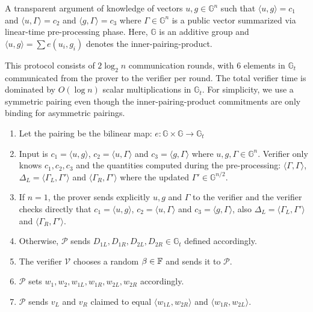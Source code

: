 \documentclass{article}
\begin{document}
\begin{boxx1} \label{def:final-dory}
A transparent argument of knowledge of vectors $u, g \in \mathbb{G}^n$ such that $\langle u, g\rangle = c_1$ and $\langle u, \Gamma \rangle = c_2$ and $\langle g, \Gamma\rangle = c_3$ where $\Gamma \in \mathbb{G}^n$ is a public vector summarized via linear-time pre-processing phase. Here, $\mathbb{G}$ is an additive group and $\langle u, g \rangle = \sum e(u_i, g_i)$ denotes the inner-pairing-product. 

This protocol consists of $2 \log_2 n$ communication rounds, with $6$ elements in $\mathbb{G}_t$ communicated from the prover to the verifier per round. The total verifier time is dominated by $O(\log n)$ scalar multiplications in $\mathbb{G}_t$. For simplicity, we use a symmetric pairing even though the inner-pairing-product commitments are only binding for asymmetric pairings. 
\begin{enumerate}
\item\label{item:97} Let the pairing be the bilinear map: $e: \mathbb{G} \times \mathbb{G} \rightarrow \mathbb{G}_t$ 
\item\label{item:98} Input is $c_1 = \langle u, g \rangle$, $c_2 = \langle u, \Gamma \rangle$ and $c_3 = \langle g, \Gamma \rangle$ where $u, g, \Gamma \in \mathbb{G}^n$. Verifier only knows $c_1, c_2, c_3$ and the quantities  computed during the pre-processing: $\langle \Gamma, \Gamma \rangle$, $\Delta_L = \langle \Gamma_L, \Gamma' \rangle$ and $\langle \Gamma_R, \Gamma' \rangle$ where the updated $\Gamma' \in \mathbb{G}^{n/2}$. 
\item\label{item:99} If $n = 1$, the prover sends explicitly $u, g$ and $\Gamma$ to the verifier and the verifier checks directly that $c_1 = \langle u, g \rangle$, $c_2 = \langle u, \Gamma \rangle$ and $c_3 = \langle g, \Gamma \rangle$, also $\Delta_L = \langle \Gamma_L, \Gamma' \rangle$ and $\langle \Gamma_R, \Gamma' \rangle$. 
\item\label{item:100} Otherwise, $\mathcal{P}$ sends $D_{1L}, D_{1R}, D_{2L}, D_{2R} \in \mathbb{G}_t$ defined accordingly. 
\item\label{item:101} The verifier $\mathcal{V}$ chooses a random $\beta \in \mathbb{F}$ and sends it to $\mathcal{P}$. 
\item\label{item:102} $\mathcal{P}$ sets $w_1, w_2, w_{1L}, w_{1R}, w_{2L}, w_{2R}$ accordingly. 
\item\label{item:103} $\mathcal{P}$ sends $v_L$ and $v_R$ claimed to equal $\langle w_{1L}, w_{2R}\rangle$ and $\langle w_{1R}, w_{2L}\rangle$. 

\end{enumerate}
\end{boxx1}
\end{document}
